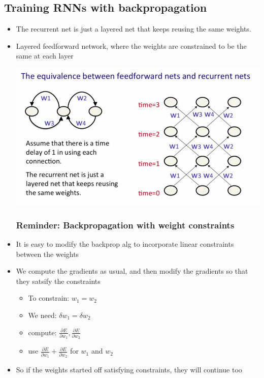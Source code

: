 \subsection{Training RNNs with backpropagation}
\begin{itemize}
	\item The recurrent net is just a layered net that keeps reusing the same weights.
	\item Layered feedforward network, where the weights are constrained to be the same at each layer
	\begin{center}
		\includegraphics[scale=0.6]{sections/7/layered.png}
	\end{center}

	\subsubsection{Reminder: Backpropagation with weight constraints}
	\item It is easy to modify the backprop alg to incorporate linear constraints between the weights
	\item We compute the gradients as usual, and then modify the gradients so that they satsify the constraints
	\begin{itemize}
		\item To constrain: $w_1 = w_2$
		\item We need: $\delta w_1 = \delta w_2$
		\item compute: $\frac{\partial E}{\partial w_1}, \frac{\partial E}{\partial w_2}$
		\item use $\frac{\partial E}{\partial w_1}+\frac{\partial E}{\partial w_2}$ for $w_1$ and $w_2$
	\end{itemize}
	\item So if the weights started off satisfying constraints, they will continue too


\end{itemize}
